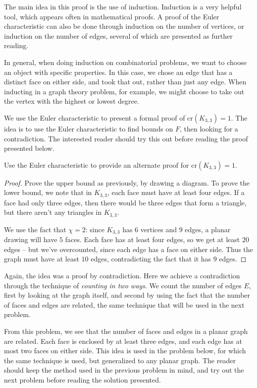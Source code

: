 \documentclass[11pt,paper=letter]{scrartcl}
\newcommand{\crs}[1]{\mathrm{cr}(#1)}
\begin{document}
The main idea in this proof is the use of induction. Induction is a very helpful tool, which appears often in mathematical proofs. A proof of the Euler characteristic can also be done through induction on the number of vertices, or induction on the number of edges, several of which are presented as further reading. \cite{wikipedia}

In general, when doing induction on combinatorial problems, we want to choose an object with specific properties. In this case, we chose an edge that has a distinct face on either side, and took that out, rather than just any edge. When inducting in a graph theory problem, for example, we might choose to take out the vertex with the highest or lowest degree.

We use the Euler characteristic to present a formal proof of $\crs{K_{3,3}} = 1$. The idea is to use the Euler characteristic to find bounds on $F$, then looking for a contradiction. The interested reader should try this out before reading the proof presented below.

\begin{problem}
Use the Euler characteristic to provide an alternate proof for $\crs{K_{3,3}} = 1$.
\end{problem}

\begin{proof}
Prove the upper bound as previously, by drawing a diagram. To prove the lower bound, we note that in $K_{3,3}$, each face must have at least four edges. If a face had only three edges, then there would be three edges that form a triangle, but there aren't any triangles in $K_{3,3}$.

We use the fact that $\chi = 2$: since $K_{3,3}$ has $6$ vertices and $9$ edges, a planar drawing will have $5$ faces. Each face has at least four edges, so we get at least $20$ edges -- but we've overcounted, since each edge has a face on either side. Thus the graph must have at least $10$ edges, contradicting the fact that it has $9$ edges.
\end{proof}

Again, the idea was a proof by contradiction. Here we achieve a contradiction through the technique of \emph{counting in two ways}. We count the number of edges $E$, first by looking at the graph itself, and second by using the fact that the number of faces and edges are related, the same technique that will be used in the next problem.

From this problem, we see that the number of faces and edges in a planar graph are related. Each face is enclosed by at least three edges, and each edge has at most two faces on either side. This idea is used in the problem below, for which the same technique is used, but generalized to any planar graph. The reader should keep the method used in the previous problem in mind, and try out the next problem before reading the solution presented.
\end{document}
